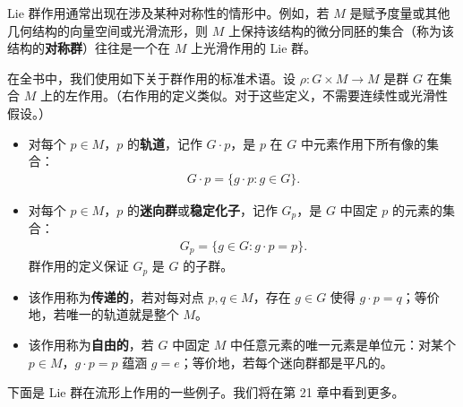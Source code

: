 \documentclass[../../main.tex]{subfiles}
\begin{document}
Lie 群作用通常出现在涉及某种对称性的情形中。例如，若 $M$ 是赋予度量或其他几何结构的向量空间或光滑流形，则 $M$ 上保持该结构的微分同胚的集合（称为该结构的\textbf{对称群}）往往是一个在 $M$ 上光滑作用的 Lie 群。

在全书中，我们使用如下关于群作用的标准术语。设 $\rho\colon G\times M\to M$ 是群 $G$ 在集合 $M$ 上的左作用。（右作用的定义类似。对于这些定义，不需要连续性或光滑性假设。）
\begin{itemize}
\item 对每个 $p\in M$，$p$ 的\textbf{轨道}，记作 $G\cdot p$，是 $p$ 在 $G$ 中元素作用下所有像的集合：
\begin{align*}
G\cdot p=\{g\cdot p:g\in G\}.
\end{align*}
\item 对每个 $p\in M$，$p$ 的\textbf{迷向群}或\textbf{稳定化子}，记作 $G_p$，是 $G$ 中固定 $p$ 的元素的集合：
\begin{align*}
G_p=\{g\in G:g\cdot p=p\}.
\end{align*}
群作用的定义保证 $G_p$ 是 $G$ 的子群。
\item 该作用称为\textbf{传递的}，若对每对点 $p,q\in M$，存在 $g\in G$ 使得 $g\cdot p=q$；等价地，若唯一的轨道就是整个 $M$。
\item 该作用称为\textbf{自由的}，若 $G$ 中固定 $M$ 中任意元素的唯一元素是单位元：对某个 $p\in M$，$g\cdot p=p$ 蕴涵 $g=e$；等价地，若每个迷向群都是平凡的。
\end{itemize}

下面是 Lie 群在流形上作用的一些例子。我们将在第 21 章中看到更多。
\end{document}

